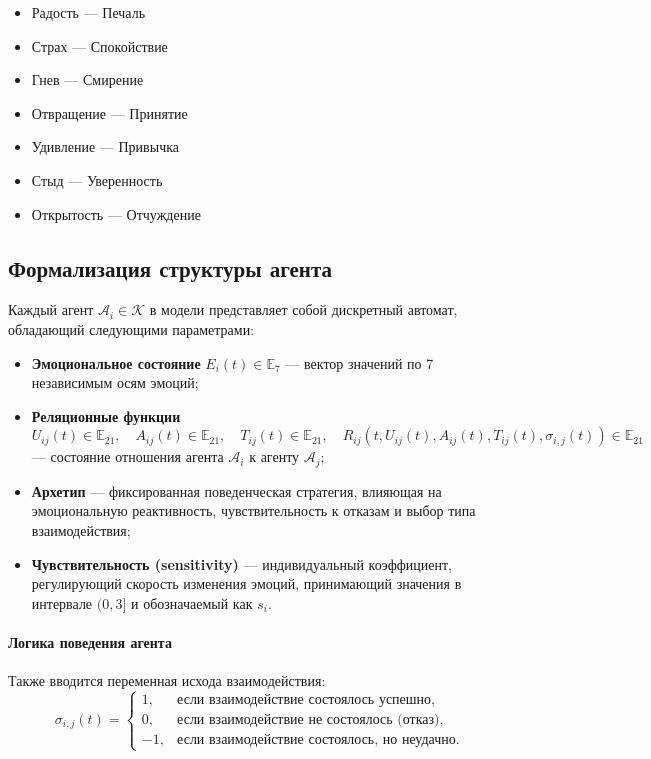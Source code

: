 \documentclass[12pt]{article}
\begin{document}
\begin{itemize}
    \item Радость — Печаль
    \item Страх — Спокойствие
    \item Гнев — Смирение
    \item Отвращение — Принятие
    \item Удивление — Привычка
    \item Стыд — Уверенность
    \item Открытость — Отчуждение
\end{itemize}

\subsection*{Формализация структуры агента}

Каждый агент \( \mathcal{A}_i \in \mathcal{K} \) в модели представляет собой дискретный автомат, обладающий следующими параметрами:

\begin{itemize}
    \item \textbf{Эмоциональное состояние} \( E_i(t) \in \mathbb{E}_7 \) — вектор значений по 7 независимым осям эмоций;
    \item \textbf{Реляционные функции}
    \[
    U_{ij}(t) \in \mathbb{E}_{21},\quad
    A_{ij}(t)\in \mathbb{E}_{21},\quad
    T_{ij}(t)\in \mathbb{E}_{21},\quad
    R_{ij}(t, U_{ij}(t), A_{ij}(t), T_{ij}(t), \sigma_{i,j}(t))\in \mathbb{E}_{21}
    \]
    — состояние отношения агента \( \mathcal{A}_i \) к агенту \( \mathcal{A}_j \);
    \item \textbf{Архетип} — фиксированная поведенческая стратегия, влияющая на эмоциональную реактивность, чувствительность к отказам и выбор типа взаимодействия;
    \item \textbf{Чувствительность (sensitivity)} — индивидуальный коэффициент, регулирующий скорость изменения эмоций, принимающий значения в интервале \((0, 3]\) и обозначаемый как \( s_i \).\end{itemize}

\paragraph{Логика поведения агента}

Также вводится переменная исхода взаимодействия:
\[
\sigma_{i,j}(t) =
\begin{cases}
    1,  & \text{если взаимодействие состоялось успешно}, \\
    0,  & \text{если взаимодействие не состоялось (отказ)}, \\
    -1, & \text{если взаимодействие состоялось, но неудачно}.
\end{cases}
\]
\end{document}
